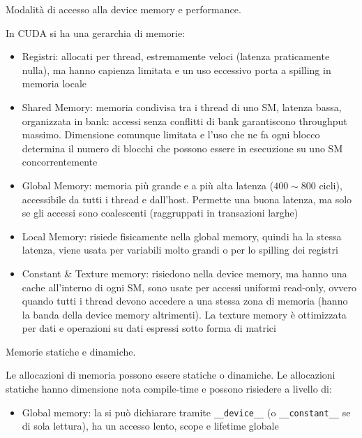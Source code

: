\begin{questions}
    \question Modalità di accesso alla device memory e performance.
    
    \begin{solution}
        In CUDA si ha una gerarchia di memorie: 
        \begin{itemize}
            \item Registri: allocati per thread, estremamente veloci (latenza praticamente nulla), ma hanno capienza limitata e un uso eccessivo porta a spilling in memoria locale
            
            \item Shared Memory: memoria condivisa tra i thread di uno SM, latenza bassa, organizzata in bank: accessi senza conflitti di bank garantiscono throughput massimo. Dimensione comunque limitata e l'uso che ne fa ogni blocco determina il numero di blocchi che possono essere in esecuzione su uno SM concorrentemente
            
            \item Global Memory: memoria più grande e a più alta latenza ($400 \sim 800$ cicli), accessibile da tutti i thread e dall'host. Permette una buona latenza, ma solo se gli accessi sono coalescenti (raggruppati in transazioni larghe)
            
            \item Local Memory: risiede fisicamente nella global memory, quindi ha la stessa latenza, viene usata per variabili molto grandi o per lo spilling dei registri
            
            \item Constant \& Texture memory: risiedono nella device memory, ma hanno una cache all'interno di ogni SM, sono usate per accessi uniformi read-only, ovvero quando tutti i thread devono accedere a una stessa zona di memoria (hanno la banda della device memory altrimenti). La texture memory è ottimizzata per dati e operazioni su dati espressi sotto forma di matrici
        \end{itemize}
    \end{solution}
    
    \question Memorie statiche e dinamiche.
    
    \begin{solution}
        Le allocazioni di memoria possono essere statiche o dinamiche. Le allocazioni statiche hanno dimensione nota compile-time e possono risiedere a livello di: 
        \begin{itemize}
            \item Global memory: la si può dichiarare tramite \texttt{\_\_device\_\_} (o \texttt{\_\_constant\_\_} se di sola lettura), ha un accesso lento, scope e lifetime globale
            

\end{itemize}
\end{solution}
\end{questions}
